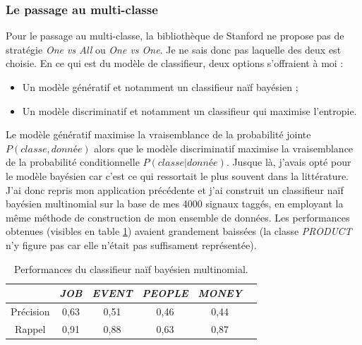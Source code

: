            \subsubsection{Le passage au multi-classe}
                Pour le passage au multi-classe, la bibliothèque de Stanford ne propose pas de stratégie \textit{One vs All} ou \textit{One vs One}. Je ne sais donc pas laquelle des deux est choisie. En ce qui est du modèle de classifieur, deux options s'offraient à moi :
                \begin{itemize}
                    \item Un modèle génératif et notamment un classifieur naïf bayésien ;
                    \item Un modèle discriminatif et notamment un classifieur qui maximise l'entropie.
                \end{itemize}
                Le modèle génératif maximise la vraisemblance de la probabilité jointe $P(classe, donnée)$ alors que le modèle discriminatif maximise la vraisemblance de la probabilité conditionnelle $P(classe | donnée)$. Jusque là, j'avais opté pour le modèle bayésien car c'est ce qui ressortait le plus souvent dans la littérature. J'ai donc repris mon application précédente et j'ai construit un classifieur naïf bayésien multinomial sur la base de mes 4000 signaux taggés, en employant la même méthode de construction de mon ensemble de données. Les performances obtenues (visibles en table \ref{tab:classif_perf2}) avaient grandement baissées (la classe \textit{PRODUCT} n'y figure pas car elle n'était pas suffisament représentée).
                \begin{table}[h]
                    \centering
                    \begin{tabular}{| c | c | c | c | c | c |}
                        \hline
                         & \textit{JOB} & \textit{EVENT} & \textit{PEOPLE} & \textit{MONEY} \\
                        \hline
                        Précision & 0,63 & 0,51 & 0,46 & 0,44 \\
                        Rappel & 0,91 & 0,88 & 0,63 & 0,87 \\
                        \hline
                    \end{tabular}
                    \caption{Performances du classifieur naïf bayésien multinomial.}
                    \label{tab:classif_perf2}
                \end{table}

